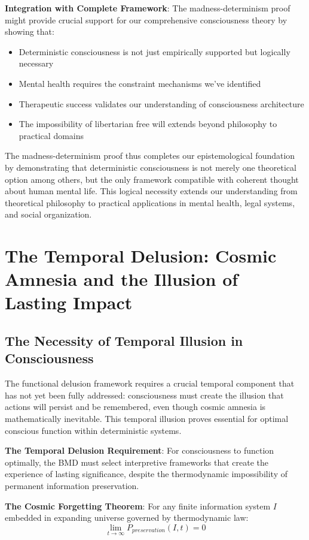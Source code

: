 \documentclass[12pt]{article}
\begin{document}
{\textbf{Integration with Complete Framework}: The madness-determinism proof might provide crucial support for our comprehensive consciousness theory by showing that:
\begin{itemize}
\item Deterministic consciousness is not just empirically supported but logically necessary
\item Mental health requires the constraint mechanisms we've identified
\item Therapeutic success validates our understanding of consciousness architecture
\item The impossibility of libertarian free will extends beyond philosophy to practical domains
\end{itemize}

The madness-determinism proof thus completes our epistemological foundation by demonstrating that deterministic consciousness is not merely one theoretical option among others, but the only framework compatible with coherent thought about human mental life. This logical necessity extends our understanding from theoretical philosophy to practical applications in mental health, legal systems, and social organization.

\section{The Temporal Delusion: Cosmic Amnesia and the Illusion of Lasting Impact}

\subsection{The Necessity of Temporal Illusion in Consciousness}

The functional delusion framework requires a crucial temporal component that has not yet been fully addressed: consciousness must create the illusion that actions will persist and be remembered, even though cosmic amnesia is mathematically inevitable. This temporal illusion proves essential for optimal conscious function within deterministic systems.

\textbf{The Temporal Delusion Requirement}: For consciousness to function optimally, the BMD must select interpretive frameworks that create the experience of lasting significance, despite the thermodynamic impossibility of permanent information preservation.

\textbf{The Cosmic Forgetting Theorem}: For any finite information system $I$ embedded in expanding universe governed by thermodynamic law:
$$\lim_{t \to \infty} P_{preservation}(I,t) = 0$$

}
\end{document}
